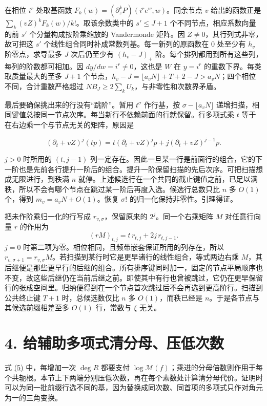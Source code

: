 \documentclass[11pt,a4paper]{article}
\begin{document}
在相位 \(i^r\) 处取基函数 \(F_k(w)=(\partial_z^kP)(i^re^w,w)\)。同余节点 \(v\) 给出的函数正是 \(\sum_k(vZ)^k F_k(w)/k!\)。取该余数类中的 \(s'\le J+1\) 个不同节点，相应系数向量的前 \(s'\) 个分量构成按阶乘缩放的 Vandermonde 矩阵。因 \(Z\ne0\)，其行列式非零，故可把这 \(s'\) 个线性组合同时补成常数列基。每一新列的原函数在 \(0\) 处至少有 \(h_v\) 阶零点，求导最多 \(J\) 次后仍至少有 \((h_v-J)_+\) 阶。每个排列都用到所有这些列，每列的阶数都可相加。因 \(dy/dw=i^r\ne0\)，这也是 \(W\) 在 \(y=i^r\) 的重数下界。每类取质量最大的至多 \(J+1\) 个节点，\(h_v-J=\lfloor a_vN\rfloor+T+2-J>a_vN\)；四个相位不同，合计重数严格超过 \(NB_J\ge2\sum_k U_k\)，与非零性和次数界矛盾。

最后要确保挑出来的行没有``跳阶''。暂用 \(t^\sigma\) 作行基，按 \(\sigma-\lfloor a_vN\rfloor\) 递增扫描，相同键值总按同一节点次序。每当新行不依赖前面的行就保留。行多项式乘 \(t\) 等于在右边乘一个与节点无关的矩阵，原因是

\[
 (\partial_t+vZ)^j(tp)=t(\partial_t+vZ)^jp+j(\partial_t+vZ)^{j-1}p .
\]

\(j>0\) 时所用的 \((t,j-1)\) 列一定存在。因此一旦某一行是前面行的组合，它的下一阶也是先前各行提升一阶后的组合。提升一阶保留扫描的先后次序。可把扫描想成无限进行，到秩满 \(n\) 就停。上述候选行在一个共同的截止键值之前，已足以满秩，所以不会有哪个节点在跳过某一阶后再度入选。候选行总数只比 \(n\) 多 \(O(1)\) 个，得到 \(m_v=a_vN+O(1)\)。恢复 \(\sigma!\) 的归一化保持非零性。引理得证。

把未作阶乘归一化的行写成 \(r_{v,\sigma}\)，保留原来的 \(2^j\)。同一个右乘矩阵 \(M\) 对任意行向量 \(r\) 的作用为 \[
 (rM)_{t,j}=t\,r_{t,j}+2j\,r_{t,j-1}.
\] \(j=0\) 时第二项为零。相位相同，且频带嵌套保证所用的列存在，所以 \(r_{v,\sigma+1}=r_{v,\sigma}M\)。若扫描到某行时它是更早诸行的线性组合，等式两边右乘 \(M\)，其后继便是那些更早行的后继的组合。所有排序键同时加一，固定的节点平局顺序也不变，故这些后继仍在当前后继之前。即使其中有行也曾被跳过，它仍在更早保留行的张成空间里。归纳便得到在一个节点首次跳过后不会再选到更高阶行。扫描到公共终止键 \(T+1\) 时，总候选数仅比 \(n\) 多 \(O(1)\)，而秩已经是 \(n\)。于是各节点与其候选前缀相差至多 \(O(1)\) 行，常数与 \(\xi\) 无关。

\section{4. 给辅助多项式清分母、压低次数}\label{ux7ed9ux8f85ux52a9ux591aux9879ux5f0fux6e05ux5206ux6bcdux538bux4f4eux6b21ux6570}

式 \hyperref[eq:5]{(5)} 中，每增加一次 \(\deg R\) 都要支付 \(\log\mathcal M(f)\)；乘进的分母倍数则作用于每个共轭根。本节上下两端分别压低次数，再在每个素数处计算清分母代价。证明时可以为同一批前缀行选不同的基，因为替换成同次数、同首项的多项式只作对角元为一的三角变换。
\end{document}
